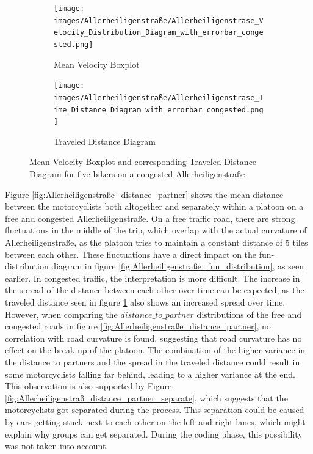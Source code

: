 \begin{figure}
     \centering
     \begin{subfigure}[b]{1.0\textwidth}
         \centering
         \texttt{[image: images/Allerheiligenstraße/Allerheiligenstrase\_Velocity\_Distribution\_Diagram\_with\_errorbar\_congested.png]}
         \caption{Mean Velocity Boxplot}
     \end{subfigure}
     \hfill
     \begin{subfigure}[b]{1.0\textwidth}
         \centering
         \texttt{[image: images/Allerheiligenstraße/Allerheiligenstrase\_Time\_Distance\_Diagram\_with\_errorbar\_congested.png]}
         \caption{Traveled Distance Diagram}
     \end{subfigure}
        \caption{Mean Velocity Boxplot and corresponding Traveled Distance Diagram for five bikers on a congested Allerheiligenstraße}
        \label{fig:Allerheiligenstraße_traveling}
\end{figure}

Figure \ref{fig:Allerheiligenstraße_distance_partner} shows the mean distance between the motorcyclists both altogether and separately within a platoon on a free and congested Allerheiligenstraße. On a free traffic road, there are strong fluctuations in the middle of the trip, which overlap with the actual curvature of Allerheiligenstraße, as the platoon tries to maintain a constant distance of 5 tiles between each other. These fluctuations have a direct impact on the fun-distribution diagram in figure \ref{fig:Allerheiligenstraße_fun_distribution}, as seen earlier. In congested traffic, the interpretation is more difficult. The increase in the spread of the distance between each other over time can be expected, as the traveled distance seen in figure \ref{fig:Allerheiligenstraße_traveling} also shows an increased spread over time. However, when comparing the $distance\_to\_partner$ distributions of the free and congested roads in figure \ref{fig:Allerheiligenstraße_distance_partner}, no correlation with road curvature is found, suggesting that road curvature has no effect on the break-up of the platoon. The combination of the higher variance in the distance to partners and the spread in the traveled distance could result in some motorcyclists falling far behind, leading to a higher variance at the end. This observation is also supported by Figure \ref{fig:Allerheiligenstraß_distance_partner_separate}, which suggests that the motorcyclists got separated during the process. This separation could be caused by cars getting stuck next to each other on the left and right lanes, which might explain why groups can get separated. During the coding phase, this possibility was not taken into account.\\

